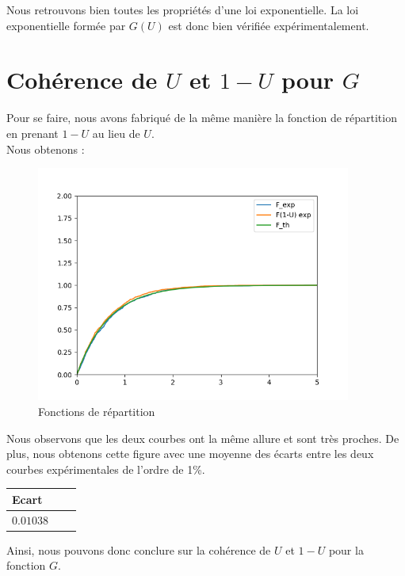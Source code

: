 \documentclass[12,french]{report}
\begin{document}
Nous retrouvons bien toutes les propriétés d'une loi exponentielle. La loi exponentielle formée par $G(U)$ est donc bien vérifiée expérimentalement.\\

\section{Cohérence de $U$ et $1-U$ pour $G$}

Pour se faire, nous avons fabriqué de la même manière la fonction de répartition en prenant $1-U$ au lieu de $U$.\\

Nous obtenons :

\begin{figure}[H]
	\center
	\includegraphics[width=0.92215\textwidth]{./Images/EcartU}
	\caption{Fonctions de répartition}
\end{figure}\vspace{0.2cm}

Nous observons que les deux courbes ont la même allure et sont très proches. De plus, nous obtenons cette figure avec une moyenne des écarts entre les deux courbes expérimentales de l'ordre de 1\%.

\begin{center}
\begin{tabular}{|l|c|r|}
				\hline
			    Ecart \\
    			\hline
   				$0.01038$\\
   				\hline
   				\end{tabular}
\end{center}

Ainsi, nous pouvons donc conclure sur la cohérence de $U$ et $1-U$ pour la fonction $G$.
\end{document}
